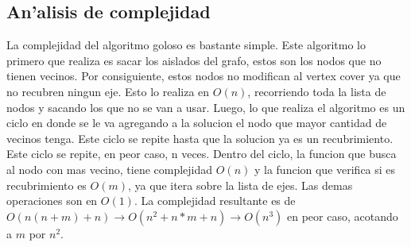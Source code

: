 \subsection{An'alisis de complejidad}
La complejidad del algoritmo goloso es bastante simple. Este algoritmo lo primero que realiza es sacar los aislados del grafo, estos son los nodos que no tienen vecinos.
Por consiguiente, estos nodos no modifican al vertex cover ya que no recubren ningun eje.
Esto lo realiza en $O(n)$, recorriendo toda la lista de nodos y sacando los que no se van a usar.
Luego, lo que realiza el algoritmo es un ciclo en donde se le va agregando a la solucion el nodo que mayor cantidad de vecinos tenga. Este ciclo se repite
hasta que la solucion ya es un recubrimiento. Este ciclo se repite, en peor caso, n veces. Dentro del ciclo, la funcion que busca al nodo con mas vecino, tiene complejidad $O(n)$ y la funcion que verifica si es recubrimiento es $O(m)$, ya que itera sobre la lista de ejes.
Las demas operaciones son en $O(1)$. 
La complejidad resultante es de $O(n(n+m)+n) \rightarrow O(n^2+n*m+n) \rightarrow O(n^3)$ en peor caso, acotando a $m$ por $n^2$.
